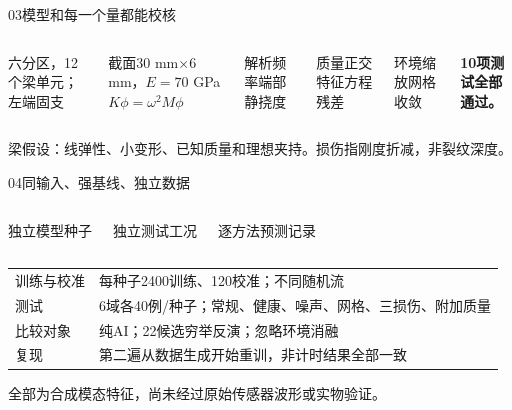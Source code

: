 \documentclass[UTF8,aspectratio=169,11pt,fontset=fandol]{ctexbeamer}
\begin{document}
\begin{frame}{03\quad 模型和每一个量都能校核}
\begin{columns}[T]\vspace{3mm}
\par\small 六分区，12个梁单元；左端固支\par 截面30 mm$\times$6 mm，$E=70$ GPa
\vspace{3mm}
$K\phi=\omega^2M\phi$\par\vspace{4mm}\small
解析频率\quad 端部静挠度\par\vspace{2mm}
质量正交\quad 特征方程残差\par\vspace{2mm}
环境缩放\quad 网格收敛\par\vspace{5mm}
\textbf{10项测试全部通过。}
\end{columns}\vspace{9mm}\small 梁假设：线弹性、小变形、已知质量和理想夹持。损伤指刚度折减，非裂纹深度。
\end{frame}
\begin{frame}{04\quad 同输入、强基线、独立数据}
\vspace{4mm}\begin{columns}[T]
\par\vspace{2mm}\small 独立模型种子
\par\vspace{2mm}\small 独立测试工况
\par\vspace{2mm}\small 逐方法预测记录
\end{columns}\par\vspace{5mm}
\begin{tabular}{p{36mm}p{90mm}}\toprule
训练与校准 & 每种子2400训练、120校准；不同随机流\\[2mm]
测试 & 6域各40例/种子；常规、健康、噪声、网格、三损伤、附加质量\\[2mm]
比较对象 & 纯AI；22候选穷举反演；忽略环境消融\\[2mm]
复现 & 第二遍从数据生成开始重训，非计时结果全部一致\\\bottomrule
\end{tabular}\par\vspace{3mm}\small 全部为合成模态特征，尚未经过原始传感器波形或实物验证。
\end{frame}
\end{document}
